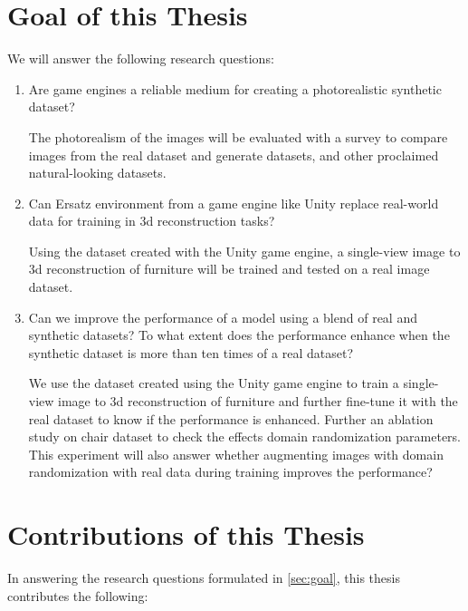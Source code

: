 \section{Goal of this Thesis}\label{sec:goal}

We will answer the following research questions:
\begin{enumerate}
    \item Are game engines a reliable medium for creating a photorealistic synthetic dataset?

    The photorealism of the images will be evaluated with a survey to compare images from the real dataset and generate datasets, and other proclaimed natural-looking datasets.

    \item Can Ersatz environment from a game engine like Unity replace real-world data for training in 3d reconstruction tasks?

    Using the dataset created with the Unity game engine, a single-view image to 3d reconstruction of furniture will be trained and tested on a real image dataset.

    \item Can we improve the performance of a model using a blend of real and synthetic datasets?
    To what extent does the performance enhance when the synthetic dataset is more than ten times of a real dataset?

    We use the dataset created using the Unity game engine to train a single-view image to 3d reconstruction of furniture and further fine-tune it with the real dataset to know if the performance is enhanced.
    Further an ablation study on chair dataset to check the effects domain randomization parameters.
    This experiment will also answer whether augmenting images with domain randomization with real data during training improves the performance?

\end{enumerate}

\section{Contributions of this Thesis}\label{sec:contributions}
In answering the research questions formulated in \autoref{sec:goal}, this thesis contributes the following:

